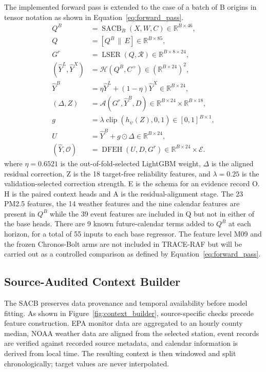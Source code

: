 \documentclass{ieeeaccess}
\begin{document}
The implemented forward pass is extended to the case of a batch of B origins in tensor notation as shown in Equation~\eqref{eq:forward_pass}.
\begin{equation}
\begin{aligned}
Q^B &= \operatorname{SACB}_{B}(X,W,C)\in\mathbb{R}^{B\times46},\\
Q &= [Q^B\,\|\,E]\in\mathbb{R}^{B\times85},\\
G^{r} &= \operatorname{LSER}(Q,\mathcal{R})
\in\mathbb{R}^{B\times8\times24},\\
(\hat{Y}^{L},\hat{Y}^{X}) &= \mathcal{H}(Q^B,C^{+})
\in(\mathbb{R}^{B\times24})^2,\\
\hat{Y}^{B} &= \eta\hat{Y}^{L}+(1-\eta)\hat{Y}^{X}
\in\mathbb{R}^{B\times24},\\
(\Delta,Z) &= \mathcal{A}(G^{r},\hat{Y}^{B},D)
\in\mathbb{R}^{B\times24}\!\times\!\mathbb{R}^{B\times18},\\
g &= \lambda\operatorname{clip}(h_{\psi}(Z),0,1)
\in[0,1]^{B\times1},\\
U &= \hat{Y}^{B}+g\odot\Delta\in\mathbb{R}^{B\times24},\\
(\hat{Y},\mathcal{O}) &= \operatorname{DFEH}(U,D,G^{r})
\in\mathbb{R}^{B\times24}\times\mathcal{E}.
\end{aligned}
\label{eq:forward_pass}
\end{equation}
where $\eta=0.6521$ is the out-of-fold-selected LightGBM weight, $\Delta$ is the aligned residual correction, Z is the 18 target-free reliability features, and $\lambda=0.25$ is the validation-selected correction strength. E is the schema for an evidence record O. H is the paired context heads and A is the residual-alignment stage. The 23 PM2.5 features, the 14 weather features and the nine calendar features are present in $Q^{B}$ while the 39 event features are included in Q but not in either of the base heads. There are 9 known future-calendar terms added to $Q^{B}$ at each horizon, for a total of 55 inputs to each base regressor. The feature level M09 and the frozen Chronos-Bolt arms are not included in TRACE-RAF but will be carried out as a controlled comparison as defined by Equation~\eqref{eq:forward_pass}.

\subsection{Source-Audited Context Builder}

The SACB preserves data provenance and temporal availability before model fitting. As shown in Figure~\ref{fig:context_builder}, source-specific checks precede feature construction. EPA monitor data are aggregated to an hourly county median, NOAA weather data are aligned from the selected station, event records are verified against recorded source metadata, and calendar information is derived from local time. The resulting context is then windowed and split chronologically; target values are never interpolated.
\end{document}
